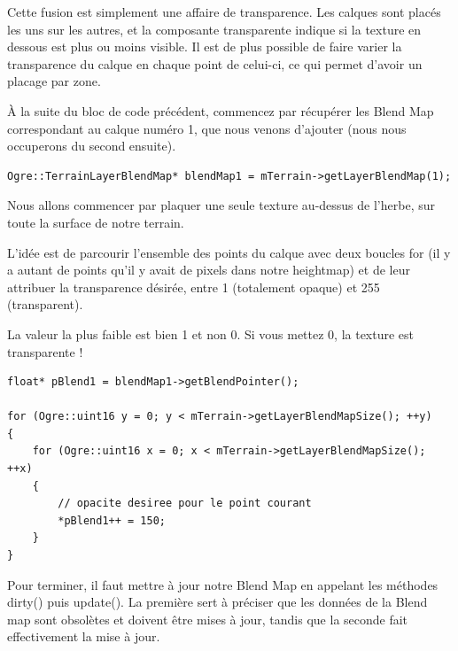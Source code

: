 \documentclass[10pt,a4paper]{report}
\begin{document}
Cette fusion est simplement une affaire de transparence. Les calques sont plac\'es les uns sur les autres, et la composante transparente indique si la texture en dessous est plus ou moins visible. Il est de plus possible de faire varier la transparence du calque en chaque point de celui-ci, ce qui permet d'avoir un placage par zone.\newline

\`A la suite du bloc de code pr\'ec\'edent, commencez par r\'ecup\'erer les Blend Map correspondant au calque num\'ero 1, que nous venons d'ajouter (nous nous occuperons du second ensuite).

\begin{lstlisting}[caption={R\'ecup\'eration du Blend Map pour le premier terrain}]
Ogre::TerrainLayerBlendMap* blendMap1 = mTerrain->getLayerBlendMap(1);
\end{lstlisting}

Nous allons commencer par plaquer une seule texture au-dessus de l'herbe, sur toute la surface de notre terrain.

L'id\'ee est de parcourir l'ensemble des points du calque avec deux boucles for (il y a autant de points qu'il y avait de pixels dans notre heightmap) et de leur attribuer la transparence d\'esir\'ee, entre 1 (totalement opaque) et 255 (transparent).

La valeur la plus faible est bien 1 et non 0. Si vous mettez 0, la texture est transparente !

\begin{lstlisting}[caption={Attribution de la transparence d\'esir\'ee sur tous les points du calque}]
float* pBlend1 = blendMap1->getBlendPointer();

for (Ogre::uint16 y = 0; y < mTerrain->getLayerBlendMapSize(); ++y)
{
    for (Ogre::uint16 x = 0; x < mTerrain->getLayerBlendMapSize(); ++x)
    {   
        // opacite desiree pour le point courant
        *pBlend1++ = 150;
    }
}
\end{lstlisting}















Pour terminer, il faut mettre \`a jour notre Blend Map en appelant les m\'ethodes dirty() puis update(). La premi\`ere sert \`a pr\'eciser que les donn\'ees de la Blend map sont obsol\`etes et doivent \^etre mises \`a jour, tandis que la seconde fait effectivement la mise \`a jour.
\end{document}
